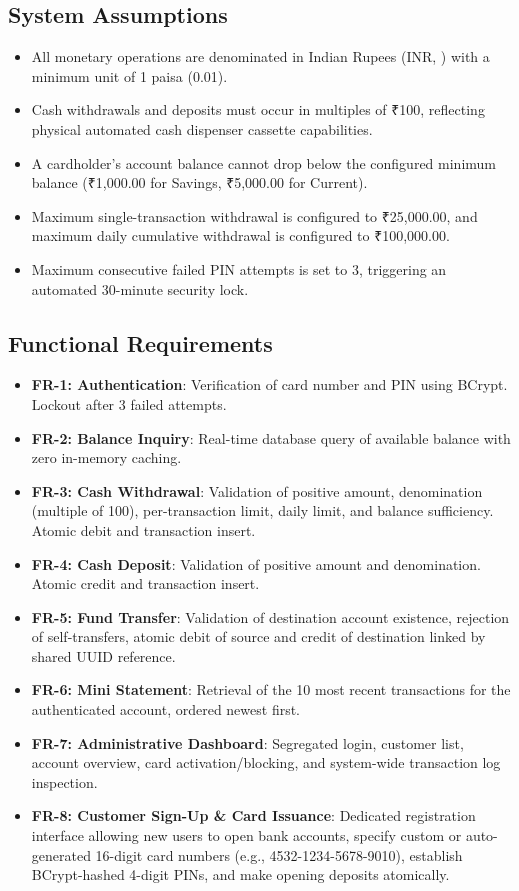 \documentclass[11pt,a4paper]{report}
\begin{document}
\subsection{System Assumptions}
\begin{itemize}
    \item All monetary operations are denominated in Indian Rupees (INR, ) with a minimum unit of 1 paisa (0.01).
    \item Cash withdrawals and deposits must occur in multiples of ₹100, reflecting physical automated cash dispenser cassette capabilities.
    \item A cardholder's account balance cannot drop below the configured minimum balance (₹1,000.00 for Savings, ₹5,000.00 for Current).
    \item Maximum single-transaction withdrawal is configured to ₹25,000.00, and maximum daily cumulative withdrawal is configured to ₹100,000.00.
    \item Maximum consecutive failed PIN attempts is set to 3, triggering an automated 30-minute security lock.
\end{itemize}

\subsection{Functional Requirements}
\begin{itemize}
    \item \textbf{FR-1: Authentication}: Verification of card number and PIN using BCrypt. Lockout after 3 failed attempts.
    \item \textbf{FR-2: Balance Inquiry}: Real-time database query of available balance with zero in-memory caching.
    \item \textbf{FR-3: Cash Withdrawal}: Validation of positive amount, denomination (multiple of 100), per-transaction limit, daily limit, and balance sufficiency. Atomic debit and transaction insert.
    \item \textbf{FR-4: Cash Deposit}: Validation of positive amount and denomination. Atomic credit and transaction insert.
    \item \textbf{FR-5: Fund Transfer}: Validation of destination account existence, rejection of self-transfers, atomic debit of source and credit of destination linked by shared UUID reference.
    \item \textbf{FR-6: Mini Statement}: Retrieval of the 10 most recent transactions for the authenticated account, ordered newest first.
    \item \textbf{FR-7: Administrative Dashboard}: Segregated login, customer list, account overview, card activation/blocking, and system-wide transaction log inspection.
    \item \textbf{FR-8: Customer Sign-Up \& Card Issuance}: Dedicated registration interface allowing new users to open bank accounts, specify custom or auto-generated 16-digit card numbers (e.g., 4532-1234-5678-9010), establish BCrypt-hashed 4-digit PINs, and make opening deposits atomically.
\end{itemize}
\end{document}
